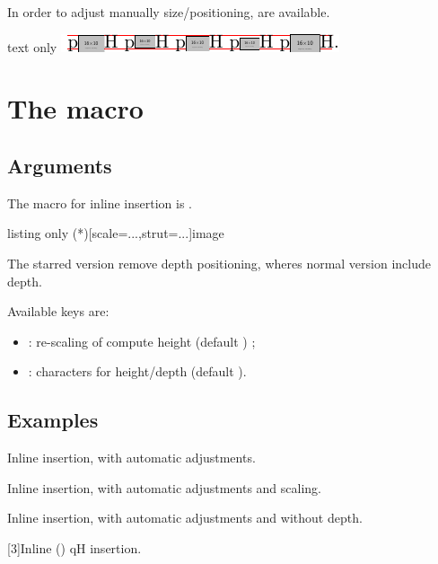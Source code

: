 \documentclass[11pt,a4paper]{ltxdoc}
\begin{document}
In order to adjust manually size/positioning, \ShowCode{[keys]} are available.

\begin{DemoCode}{text only}
\includegraphics[scale=3]{test_inlinegraphicx}
\end{DemoCode}

\section{The macro}

\subsection{Arguments}

The macro for inline insertion is \ShowCode{\\inlinegraphics}.

\begin{DemoCode}{listing only}
\inlinegraphics(*)[scale=...,strut=...]{image}
\end{DemoCode}

The starred version remove depth positioning, wheres normal version include depth.

Available keys are:

\begin{itemize}
	\item {}: re-scaling of compute height (default ) ;
	\item {}: characters for height/depth (default ).
\end{itemize}

\subsection{Examples}

\begin{DemoCode}{}
Inline insertion,  with automatic adjustments.

Inline insertion,  with automatic adjustments and scaling.

Inline insertion,  with automatic adjustments and without depth.
\end{DemoCode}

\begin{DemoCode}{}
\scalebox{3}[3]{Inline () qH insertion}.
\end{DemoCode}
\end{document}

